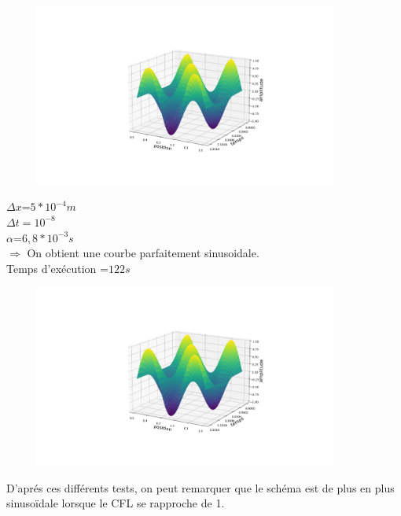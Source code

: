 \begin{enumerate}[label=\alph*)]
\begin{minipage}{.5\textwidth}
\end{minipage}%
\hfill
\begin{minipage}{.45\textwidth}%
\includegraphics[width=12cm,height=6cm]{explicitee.png}
\end{minipage}%


\begin{minipage}{.5\textwidth}%


\item $\Delta x$=$5*{10}^{-4}m$\\
$\Delta t={10}^{-8}$\\
$\alpha$=$6,8*{10}^{-3}s$\\


$\Longrightarrow$ On obtient une courbe parfaitement sinusoidale.\\
Temps d'exécution =$122s$
\end{minipage}%
\hfill
\begin{minipage}{.45\textwidth}%
\includegraphics[width=12cm,height=6cm]{explicitee.png}
\end{minipage}%



\end{enumerate}
D'aprés ces différents tests, on peut remarquer que le schéma est de plus en plus sinusoïdale lorsque le CFL se rapproche de 1.\\




